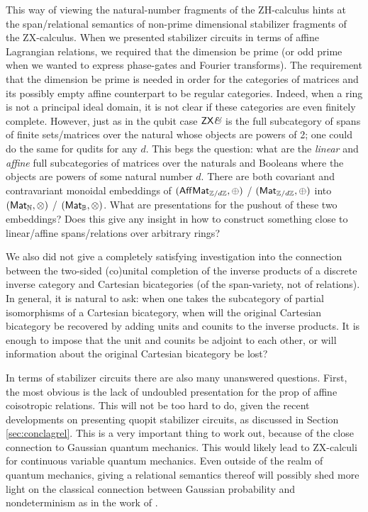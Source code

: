 This way of viewing the natural-number fragments of the ZH-calculus hints at the span/relational semantics of non-prime dimensional stabilizer fragments of the  ZX-calculus.  When we presented stabilizer circuits in terms of affine Lagrangian relations, we required that the dimension be prime (or odd prime when we wanted to express phase-gates and Fourier transforms).  The requirement that the dimension be prime is needed in order for the categories of matrices and its possibly empty affine counterpart to be regular categories.  Indeed,  when a ring is not a principal ideal domain, it is not clear if these categories are even finitely complete.  However, just as in the qubit case $\mathsf{ZX}\textit{\&}$ is the full subcategory of spans of finite sets/matrices over the natural whose objects are powers of 2; one could do the same for qudits for any $d$.  This begs the question: what are the {\em linear} and {\em affine} full subcategories of matrices over the naturals and Booleans where the objects are powers of some natural number $d$.  There are both covariant and contravariant monoidal embeddings of $(\mathsf{Aff}\mathsf{Mat}_{\mathbb{Z}/d\mathbb{Z}},\oplus)$ / $(\mathsf{Mat}_{\mathbb{Z}/d\mathbb{Z}},\oplus)$ into $(\mathsf{Mat}_{\mathbb{N}},\otimes)$ / $(\mathsf{Mat}_{\mathbb{B}},\otimes)$.  What are presentations for the pushout of these two embeddings?  Does this give any insight in how to construct something close to linear/affine spans/relations over arbitrary rings?

We also did not give a completely satisfying investigation into the connection between the two-sided (co)unital completion of the inverse products of a discrete inverse category and Cartesian bicategories (of the span-variety, not of relations).  In general, it is natural to ask: when one takes the subcategory of partial isomorphisms of a Cartesian bicategory, when will the original Cartesian bicategory be recovered by adding units and counits to the inverse products.  It is enough to impose that the unit and counits be adjoint to each other, or will information about the original Cartesian bicategory be lost?


In terms of stabilizer circuits there are also many unanswered questions.  First, the most obvious is the lack of undoubled presentation for the prop of affine coisotropic relations.  This will not be too hard to do, given the recent developments on presenting quopit stabilizer circuits, as discussed in Section \ref{sec:conclagrel}.  This is a very important thing to work out, because of the close connection to Gaussian quantum mechanics.  This would likely lead to ZX-calculi for continuous variable quantum mechanics.  Even outside of the realm of quantum mechanics, giving  a relational semantics thereof will possibly shed more light on the classical connection between Gaussian probability and nondeterminism as in the work of \cite{stein}.


